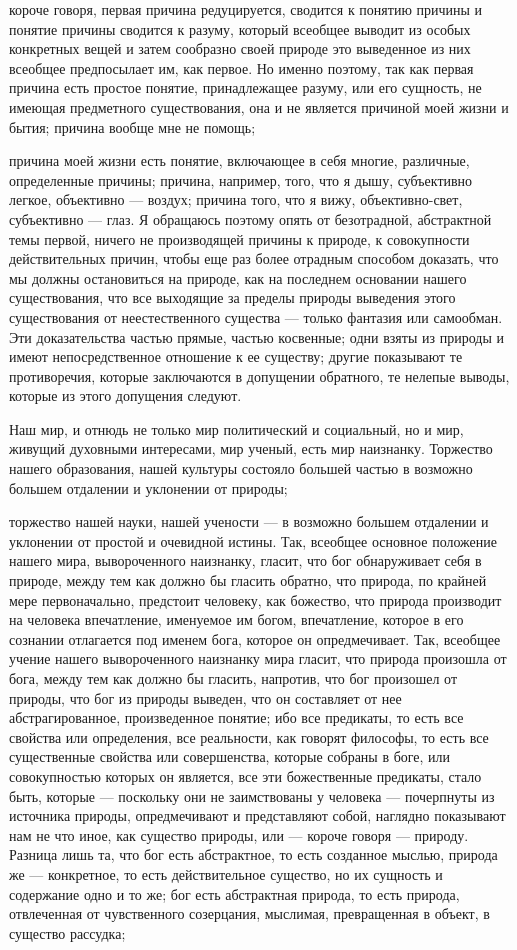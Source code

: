 \documentclass[12pt]{article}
\begin{document}
короче говоря, первая причина редуцируется, сводится к понятию причины и понятие причины сводится к разуму, который всеобщее выводит из особых конкретных вещей и затем сообразно своей природе это выведенное из них всеобщее предпосылает им, как первое. Но именно поэтому, так как первая причина есть простое понятие, принадлежащее разуму, или его сущность, не имеющая предметного существования, она и не является причиной моей жизни и бытия; причина вообще мне не помощь; 

причина моей жизни есть понятие, включающее в себя многие, различные, определенные причины; причина, например, того, что я дышу, субъективно легкое, объективно --- воздух; причина того, что я вижу, объективно-свет, субъективно --- глаз. Я обращаюсь поэтому опять от безотрадной, абстрактной темы первой, ничего не производящей причины к природе, к совокупности действительных причин, чтобы еще раз более отрадным способом доказать, что мы должны остановиться на природе, как на последнем основании нашего существования, что все выходящие за пределы природы выведения этого существования от неестественного существа --- только фантазия или самообман. Эти доказательства частью прямые, частью косвенные; одни взяты из природы и имеют непосредственное отношение к ее существу; другие показывают те противоречия, которые заключаются в допущении обратного, те нелепые выводы, которые из этого допущения следуют. 

Наш мир, и отнюдь не только мир политический и социальный, но и мир, живущий духовными интересами, мир ученый, есть мир наизнанку. Торжество нашего образования, нашей культуры состояло большей частью в возможно большем отдалении и уклонении от природы; 

торжество нашей науки, нашей учености --- в возможно большем отдалении и уклонении от простой и очевидной истины. Так, всеобщее основное положение нашего мира, вывороченного наизнанку, гласит, что бог обнаруживает себя в природе, между тем как должно бы гласить обратно, что природа, по крайней мере первоначально, предстоит человеку, как божество, что природа производит на человека впечатление, именуемое им богом, впечатление, которое в его сознании отлагается под именем бога, которое он опредмечивает. Так, всеобщее учение нашего вывороченного наизнанку мира гласит, что природа произошла от бога, между тем как должно бы гласить, напротив, что бог произошел от природы, что бог из природы выведен, что он составляет от нее абстрагированное, произведенное понятие; ибо все предикаты, то есть все свойства или определения, все реальности, как говорят философы, то есть все существенные свойства или совершенства, которые собраны в боге, или совокупностью которых он является, все эти божественные предикаты, стало быть, которые --- поскольку они не заимствованы у человека --- почерпнуты из источника природы, опредмечивают и представляют собой, наглядно показывают нам не что иное, как существо природы, или --- короче говоря --- природу. Разница лишь та, что бог есть абстрактное, то есть созданное мыслью, природа же --- конкретное, то есть действительное существо, но их сущность и содержание одно и то же; бог есть абстрактная природа, то есть природа, отвлеченная от чувственного созерцания, мыслимая, превращенная в объект, в существо рассудка; 
\end{document}
